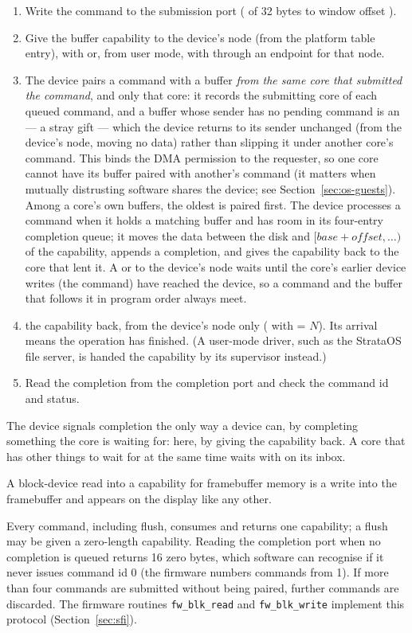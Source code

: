 \begin{enumerate}
\item Write the command to the submission port ( of 32 bytes to window offset ).
\item Give the buffer capability to the device's node (from the platform table entry), with
   or, from user mode, with  through an endpoint for that node.
\item The device pairs a command with a buffer \emph{from the same core that submitted the command},
  and only that core: it records the submitting core of each queued command, and a buffer whose sender
  has no pending command is an  --- a stray gift --- which the device returns to its
  sender unchanged (from the device's node, moving no data) rather than slipping it under another
  core's command. This binds the DMA permission
  to the requester, so one core cannot have its buffer paired with another's command (it matters when
  mutually distrusting software shares the device; see Section~\ref{sec:os-guests}). Among a core's own
  buffers, the oldest is paired first. The device processes a command when it holds a matching buffer
  and has room in its four-entry completion queue; it moves the data between the disk and
  $[\textit{base} + \textit{offset}, \ldots)$ of the capability, appends a completion, and gives the
  capability back to the core that lent it. A  or  to the device's node
  waits until the core's earlier device writes (the command) have reached the device, so a command
  and the buffer that follows it in program order always meet.
\item {} the capability back, from the device's node only ( with  = $N$). Its arrival means the operation has finished. (A user-mode driver, such as the StrataOS file server, is handed the capability by its supervisor instead.)
\item Read the completion from the completion port and check the command id and status.
\end{enumerate}

The device signals completion the only way a device can, by completing something the core is waiting
for: here, by giving the capability back. A core that has other things to wait for at the same time
waits with  on its inbox.

A block-device read into a capability for framebuffer memory is a write into the framebuffer and
appears on the display like any other.

Every command, including flush, consumes and returns one capability; a flush may be given a
zero-length capability. Reading the completion port when no completion is queued returns 16 zero bytes,
which software can recognise if it never issues command id 0 (the firmware numbers commands from 1). If more than four commands are
submitted without being paired, further commands are discarded. The firmware routines
\texttt{fw\_blk\_read} and \texttt{fw\_blk\_write} implement this protocol (Section~\ref{sec:sfi}).

